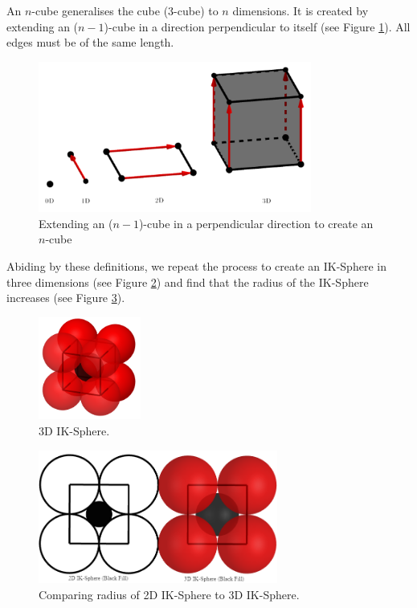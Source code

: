 \begin{definition}[$n$-Cube]\label{def:n-cube}
    An $n$-cube generalises the cube (3-cube) to $n$ dimensions. It is created by extending an ($n-1$)-cube in a direction perpendicular to itself (see Figure \ref{fig:how to n cube}). All edges must be of the same length.
    \begin{figure}[H]
    \centering
    \includegraphics[width=0.8\textwidth]{images/how to make n sphere.png}
    \caption{\label{fig:how to n cube}Extending an ($n-1$)-cube in a perpendicular direction to create an $n$-cube}
    \end{figure}
\end{definition}
\noindent Abiding by these definitions, we repeat the process to create an IK-Sphere in three dimensions (see Figure \ref{fig:3d_IK_Sphere}) and find that the radius of the IK-Sphere increases (see Figure \ref{fig:compare IK spheres}). 

\begin{figure}[H]
    \centering
    \includegraphics[width=0.3\textwidth]{images/3D IK.png}
    \caption{\label{fig:3d_IK_Sphere}3D IK-Sphere.}
\end{figure}

\begin{figure}[H]
    \centering
    \includegraphics[width=0.7\textwidth]{images/compare ik spheres.png}
    \caption{\label{fig:compare IK spheres}Comparing radius of 2D IK-Sphere to 3D IK-Sphere.}
\end{figure}

